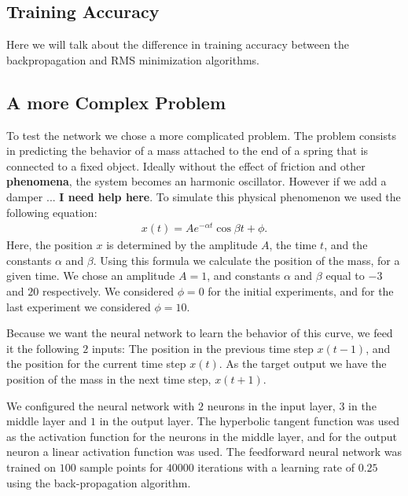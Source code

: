 \documentclass[11pt]{article}
\begin{document}
\subsection{Training Accuracy} %
\label{sub:training_accuracy}

Here we will talk about the difference in training accuracy between the backpropagation and RMS minimization algorithms.


\subsection{A more Complex Problem} %
\label{sub:a_more_complex_problem}

To test the network we chose a more complicated problem. The problem consists in predicting the behavior of a mass attached to the end
of a spring that is connected to a fixed object. Ideally without the effect of friction and other \textbf{phenomena}, the system becomes
an harmonic oscillator. However if we add a damper ... \textbf{I need help here}. To simulate this physical phenomenon we used the
following equation:
\begin{eqnarray}\label{eqn:damping}
	x(t) = Ae^{-\alpha t}\cos{\beta t+\phi}.
\end{eqnarray}
Here, the position $x$ is determined by the amplitude $A$, the time $t$, and the constants $\alpha$ and $\beta$. Using this formula we
calculate the position of the mass, for a given time. We chose an amplitude $A=1$, and constants $\alpha$ and $\beta$ equal to $-3$ and $20$ respectively. We considered $\phi=0$ for the initial experiments, and for the last experiment we considered $\phi=10$.

Because we want the neural network to learn the behavior of this curve, we feed
it the following $2$ inputs: The position in the previous time step $x(t-1)$, and the position for the current time step $x(t)$. As the
target output we have the position of the mass in the next time step, $x(t+1)$.

We configured the neural network with $2$ neurons in the input layer, $3$ in the middle layer and $1$ in the output layer. The
hyperbolic tangent function was used as the activation function for the neurons in the middle layer, and for the output neuron a linear
activation function was used. The feedforward neural network was trained on $100$ sample points for $40000$ iterations with a learning
rate of $0.25$ using the back-propagation algorithm.
\end{document}
